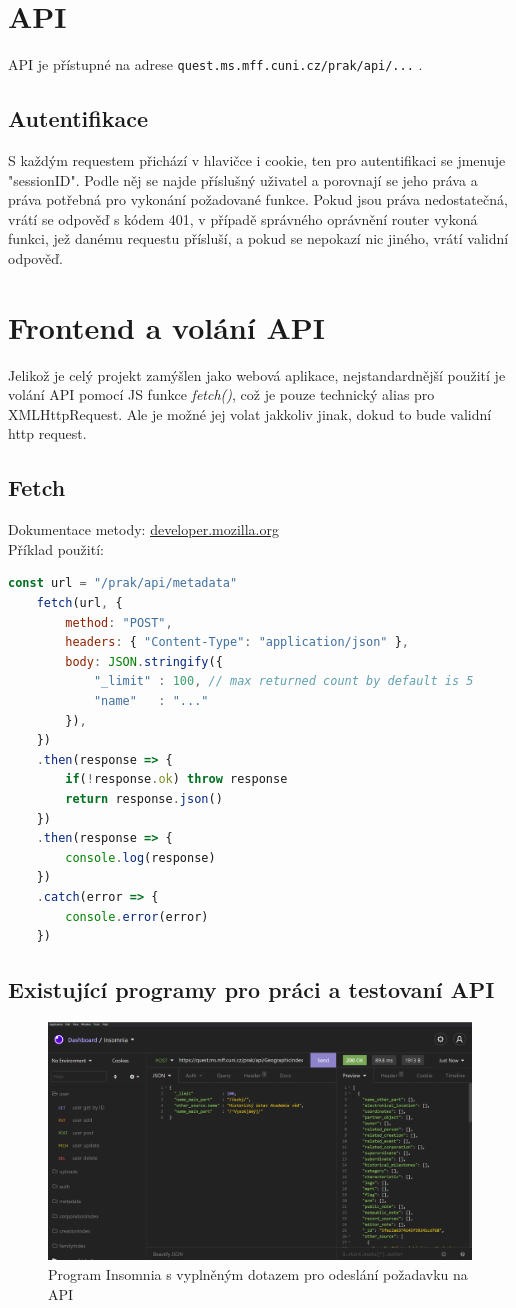 \section{API}
API je přístupné na adrese \texttt{quest.ms.mff.cuni.cz/prak/api/...} .

\subsection{Autentifikace}
S každým requestem přichází v hlavičce i cookie, ten pro
autentifikaci se jmenuje "sessionID".
Podle něj se najde příslušný uživatel a porovnají se jeho práva a
práva potřebná pro vykonání požadované funkce. Pokud jsou práva nedostatečná,
vrátí se odpověď s kódem 401, v případě správného oprávnění router vykoná funkci,
jež danému requestu přísluší, a pokud se nepokazí nic jiného, vrátí validní odpověď.

\section{Frontend a volání API}
Jelikož je celý projekt zamýšlen jako webová aplikace, nejstandardnější použití
je volání API pomocí JS funkce \textit{fetch()}, což je pouze technický alias pro XMLHttpRequest.
Ale je možné jej volat jakkoliv jinak, dokud to bude validní http request.

\subsection{Fetch}
Dokumentace metody: \href{https://developer.mozilla.org/en-US/docs/Web/API/Fetch_API}{developer.mozilla.org}
\\
Příklad použití:
\\
\begin{lstlisting}[language=JavaScript]
	const url = "/prak/api/metadata" 
	fetch(url, {
		method: "POST",
		headers: { "Content-Type": "application/json" },
		body: JSON.stringify({
			"_limit" : 100, // max returned count by default is 5 
			"name"   : "..."
		}),
	})
	.then(response => {
		if(!response.ok) throw response
		return response.json()
	})
	.then(response => {
		console.log(response)
	})
	.catch(error => {
		console.error(error)
	})
\end{lstlisting}

\subsection{Existující programy pro práci a testovaní API}
\begin{figure}[H]
	\centering
	\includegraphics[angle=90,width=.87\linewidth]{img/InsomniaExample.PNG}
	\caption{Program Insomnia s vyplněným dotazem pro odeslání požadavku na API}
\end{figure}
